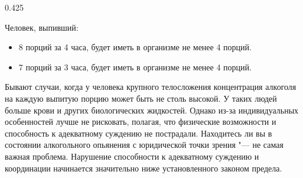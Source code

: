 \begin{langblock}{0.425}
\begin{rus}
		
		
		Человек, выпивший:
		\begin{itemize}[noitemsep]
			\item 8 порций за 4 часа, будет иметь в организме не менее 4 порций.
			\item 7 порций за 3 часа, будет иметь в организме не менее 4 порций.
		\end{itemize}
		
		Бывают случаи, когда у человека крупного телосложения концентрация алкоголя на каждую выпитую порцию может быть не столь высокой. У таких людей больше крови и других биологических жидкостей. Однако из-за индивидуальных особенностей лучше не рисковать, полагая, что физические возможности и способность к адекватному суждению не пострадали. Находитесь ли вы в состоянии алкогольного опьянения с юридической точки зрения "--- не самая важная проблема. Нарушение способности к адекватному суждению и координации начинается значительно ниже установленного законом предела.
\end{rus}
\end{langblock}





